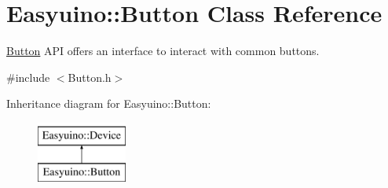 \hypertarget{class_easyuino_1_1_button}{}\section{Easyuino\+:\+:Button Class Reference}
\label{class_easyuino_1_1_button}


\hyperlink{class_easyuino_1_1_button}{Button} A\+PI offers an interface to interact with common buttons.  




{\ttfamily \#include $<$Button.\+h$>$}

Inheritance diagram for Easyuino\+:\+:Button\+:\begin{figure}[H]
\begin{center}
\leavevmode
\includegraphics[height=2.000000cm]{class_easyuino_1_1_button}
\end{center}
\end{figure}
